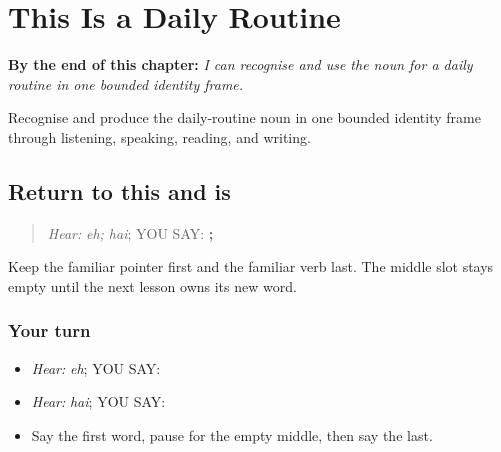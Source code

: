 
\chapter{This Is a Daily Routine}
\label{ch:pa-a2-dinchariya}

\begin{chapteropening}
\textbf{By the end of this chapter:} \emph{I can recognise and use the noun for a daily routine in one bounded identity frame.}

Recognise and produce the daily-routine noun in one bounded identity frame through listening, speaking, reading, and writing.
\end{chapteropening}

\section[\texorpdfstring{\pa{ਇਹ} · \pa{ਹੈ} (eh; hai)}{ਇਹ · ਹੈ (eh; hai)}]{Return to this and is}

\label{lesson:PA-C197-routine-return}



\begin{quote}
\emph{Hear:} \emph{eh; hai}; YOU SAY: \textbf{; }
\end{quote}

\begin{grammarlens}[title={Grammar Lens}]
Keep the familiar pointer first and the familiar verb last. The middle slot stays empty until the next lesson owns its new word.
\end{grammarlens}

\subsection*{Your turn}
\begin{itemize}
\raggedright
  \item \emph{Hear:} \emph{eh}; YOU SAY: \textbf{}
  \item \emph{Hear:} \emph{hai}; YOU SAY: \textbf{}
  \item Say the first word, pause for the empty middle, then say the last.
\end{itemize}

